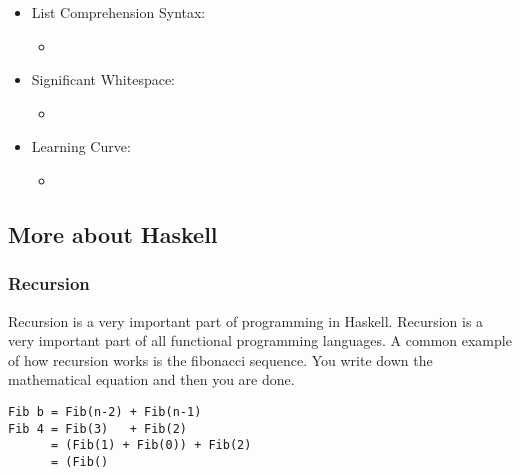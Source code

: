 \documentclass{article}
\begin{document}
\begin{itemize}
  \item List Comprehension Syntax:
  \begin{itemize}
    \item
    \end{itemize}
  \item Significant Whitespace:
    \begin{itemize}
    \item
    \end{itemize}
  \item Learning Curve:
    \begin{itemize}
    \item
    \end{itemize}

\end{itemize}






\subsection{More about Haskell}
\subsubsection{Recursion}
Recursion is a very important part of programming in Haskell. Recursion is a very important part of all functional programming languages. A common example of how recursion works is the fibonacci sequence. You write down the mathematical equation and then you are done.

\begin{lstlisting}
Fib b = Fib(n-2) + Fib(n-1)
Fib 4 = Fib(3)   + Fib(2)
      = (Fib(1) + Fib(0)) + Fib(2)
      = (Fib()
\end{lstlisting}

\end{document}
